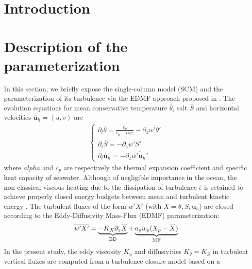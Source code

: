 \documentclass[draft]{agujournal2019}
\begin{document}
%
%


\section{Introduction}

\section{Description of the parameterization}

In this section, we briefly expose the single-column model (SCM) and the parameterization of its turbulence via the EDMF approach proposed in . The evolution equations for mean conservative temperature $\overline{\theta}$, salt $\overline{S}$ and horizontal velocities $\overline{\bm u}_h = (\overline{u},\overline{v})$ are 
%
\begin{eqnarray*}
    \begin{cases}
        \partial_t \overline{\theta} = \frac{\overline{\epsilon}_\nu }{c_p - \alpha gz } - \partial_z \overline{w' \theta'} \label{eq:temp budget}
        \\
        \partial_t \overline{S} = - \partial_z \overline{w' S'}
        \\
        \partial_t \overline{\bm u}_h = - \partial_z \overline{w' \bm u_h'}
    \end{cases}
\end{eqnarray*}
%
where $alpha$ and $c_p$ are respectively the thermal expansion coefficient and specific heat capacity of seawater. Although of negligible importance in the ocean, the non-classical viscous heating due to the dissipation of turbulence $\overline{\epsilon}$ is retained to achieve  properly closed energy budgets between mean and turbulent kinetic energy \cite{perrotEnergeticallyConsistentEddyDiffusivity2024}. The turbulent fluxes of the form $\overline{w'X'}$ (with $X=\theta,S,\bm u_h$) are closed according to the Eddy-Diffusivity Mass-Flux (EDMF) parameterization:
%
\begin{eqnarray*}
    \overline{w'X'} = \underbrace{-K_X \partial_z \overline{X}}_{\rm{ED}} + \underbrace{a_p w_p (X_p - \overline{X})}_{\rm{MF}}
\end{eqnarray*}
%
In the present study, the eddy viscosity $K_u$ and diffusivities $K_\theta=K_S$ 
in turbulent vertical fluxes are computed from a turbulence closure model based on a 
\end{document}
